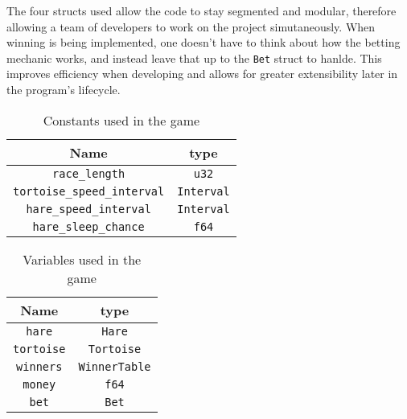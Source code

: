 \documentclass[11pt]{article}
\begin{document}
The four structs used allow the code to stay segmented and modular, therefore allowing a team of
developers to work on the project simutaneously. When winning is being implemented, one doesn't have
to think about how the betting mechanic works, and instead leave that up to the \texttt{Bet} struct
to hanlde. This improves efficiency when developing and allows for greater extensibility later in the
program's lifecycle.

\begin{table}[!ht]
	\centering
	\begin{tabular}{ | c c | }
		\hline
		Name                               & type              \\
		\hline
		\texttt{race\_length}              & \texttt{u32}      \\
		\texttt{tortoise\_speed\_interval} & \texttt{Interval} \\
		\texttt{hare\_speed\_interval}     & \texttt{Interval} \\
		\texttt{hare\_sleep\_chance}       & \texttt{f64}      \\
		\hline
	\end{tabular}
	\caption{Constants used in the game}%
	\label{tab:consts}
\end{table}
\begin{table}[!ht]
	\centering
	\begin{tabular}{ | c c | }
		\hline
		Name              & type                 \\ \hline
		\texttt{hare}     & \texttt{Hare}        \\
		\texttt{tortoise} & \texttt{Tortoise}    \\
		\texttt{winners}  & \texttt{WinnerTable} \\
		\texttt{money}    & \texttt{f64}         \\
		\texttt{bet}      & \texttt{Bet}         \\ \hline
	\end{tabular}
	\caption{Variables used in the game}
	\label{tab:vars}
\end{table}
\end{document}
